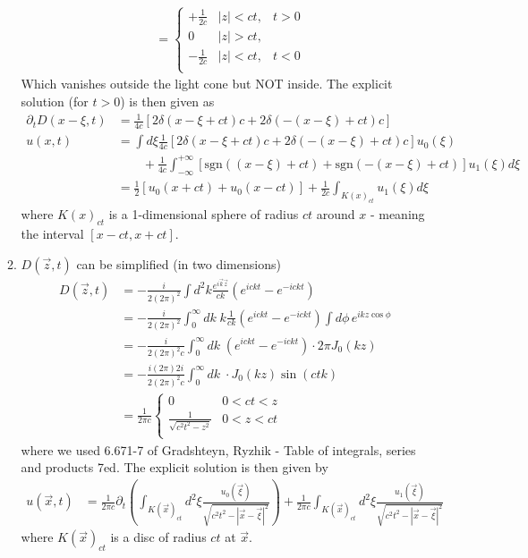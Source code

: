 \documentclass[10pt,a4paper]{book}
\theoremstyle{definition}
\begin{document}
\begin{itemize}
\begin{enumerate}
\begin{align}
&=\left\{\begin{matrix}
+\frac{1}{2c}&|z|<ct,& t>0\\
0& |z|>ct,&\\
-\frac{1}{2c}&|z|<ct,& t<0\\
\end{matrix}\right.
\end{align}
Which vanishes outside the light cone but NOT inside. The explicit solution (for $t>0$) is then given as 
\begin{align}
\partial_t D(x-\xi,t)&=\frac{1}{4c}\left[2\delta(x-\xi+ct)c+2\delta(-(x-\xi)+ct)c\right]\\
u(x,t)
&=\int d\xi \frac{1}{4c}\left[2\delta(x-\xi+ct)c+2\delta(-(x-\xi)+ct)c\right]u_0(\xi)\\
&\qquad+\frac{1}{4c}\int_{-\infty}^{+\infty}\left[\text{sgn}((x-\xi)+ct)+\text{sgn}(-(x-\xi)+ct)\right]u_1(\xi)d\xi\\
&=\frac{1}{2}\left[u_0(x+ct)+u_0(x-ct)\right]+\frac{1}{2c}\int_{K(x)_{ct}}u_1(\xi)d\xi
\end{align}
where $K(x)_{ct}$ is a 1-dimensional sphere of radius $ct$ around $x$ - meaning the interval $[x-ct,x+ct]$.

\item $D(\vec{z},t)$ can be simplified (in two dimensions)
\begin{align}
D(\vec{z},t)&=-\frac{i}{2(2\pi)^2}\int d^2k\frac{e^{i\vec{k}\vec{z}}}{ck}(e^{ickt}-e^{-ickt})\\
&=-\frac{i}{2(2\pi)^2}\int_0^\infty dk\;k\frac{1}{ck}(e^{ickt}-e^{-ickt})\int d\phi\,e^{ikz\cos\phi}\\
&=-\frac{i}{2(2\pi)^2c}\int_0^\infty dk\;(e^{ickt}-e^{-ickt})\cdot 2\pi J_0(kz)\\
&=-\frac{i(2\pi)2i}{2(2\pi)^2c}\int_0^\infty dk\;\cdot J_0(kz)\sin(ctk)\\
&=\frac{1}{2\pi c}\left\{\begin{matrix}
0& 0<ct<z\\
\frac{1}{\sqrt{c^2t^2-z^2}}& 0<z<ct\\
\end{matrix}\right.
\end{align}
where we used 6.671-7 of Gradshteyn, Ryzhik - Table of integrals, series and products 7ed.
The explicit solution is then given by
\begin{align}
u(\vec{x},t)&=\frac{1}{2\pi c}\partial_t\left(\int_{K(\vec{x})_{ct}} d^2\xi \frac{u_0(\vec{\xi})}{\sqrt{c^2t^2-|\vec{x}-\vec{\xi}|^2}}\right)+\frac{1}{2\pi c}\int_{K(\vec{x})_{ct}} d^2\xi \frac{u_1(\vec{\xi})}{\sqrt{c^2t^2-|\vec{x}-\vec{\xi}|^2}}
\end{align}
where $K(\vec{x})_{ct}$ is a disc of radius $ct$ at $\vec{x}$.



\end{enumerate}
\end{itemize}
\end{document}
